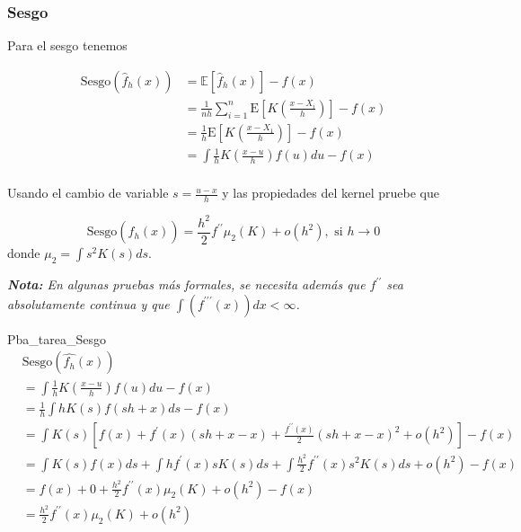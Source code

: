 \documentclass[12pt]{book}\usepackage[]{graphicx}\usepackage[]{color}
\theoremstyle{definition}
\theoremstyle{plain}
\begin{document}
\newpage

\subsubsection{Sesgo}

Para el sesgo tenemos

\begin{align*}
	\mathrm{Sesgo}\left(\hat{f}_{h}(x)\right)
	  & = \mathbb{E}\left[\hat{f}_{h}(x)\right]-f(x)                                                  \\
	  & = \frac{1}{nh} \sum_{i=1}^{n} \mathrm{E}\left[K\left( \frac{x-X_{i}}{h} \right)\right] - f(x) \\
	  & = \frac{1}{h}\mathrm{E}\left[K\left( \frac{x-X_{1}}{h} \right)\right] - f(x)                  \\
	  & = \int \frac{1}{h} K\left( \frac{x-u}{h}\right)f(u)du -f(x)                                   \\
\end{align*}

\begin{tarea}{}{}
	Usando el cambio de variable \(s=\frac{u-x}{h}\) y las propiedades del kernel pruebe que

	\begin{equation*}
		\mathrm{Sesgo}\left(\hat{f}_{h}(x)\right) = \frac{h^{2}}{2} f^{\prime\prime} \mu_{2}(K) + o(h^{2}), \text{ si } h\to 0
	\end{equation*}
	donde \(\mu_{2}=\int s^{2}K(s)ds\).

	\emph{\textbf{Nota:} En algunas pruebas más formales, se necesita
	además que  $f^{\prime\prime}$ sea absolutamente continua y que
	$\int(f^{\prime\prime\prime}(x))dx<\infty$.}
\end{tarea}

\begin{solucion}{}{Pba_tarea_Sesgo}
	\begin{align*}
		  & \mathrm{Sesgo}(\hat{f_{h}}(x))
		\\
		  & = \int \frac{1}{h} K\left( \frac{x-u}{h} \right) f(u)du - f(x)
		\\
		  & = \frac{1}{h} \int hK(s)f(sh+x) ds - f(x)
		\\
		  & = \int K(s)\left[ f(x) + f^{\prime}(x)(sh+x-x) + \frac{f^{\prime\prime}(x)}{2}(sh+x-x)^2 + o(h^{2}) \right] - f(x)
		\\
		  & = \int K(s)f(x)ds + \int hf^{\prime}(x)sK(s) ds + \int \frac{h^2}{2} f^{\prime\prime}(x)s^2K(s) ds + o(h^2) - f(x)
		\\
		  & = f(x) + 0 + \frac{h^2}{2}f^{\prime\prime}(x)\mu_{2}(K) + o(h^2) - f(x)
		\\
		  & = \frac{h^2}{2}f^{\prime\prime}(x)\mu_{2}(K) + o(h^2)
	\end{align*}
\end{solucion}
\end{document}
